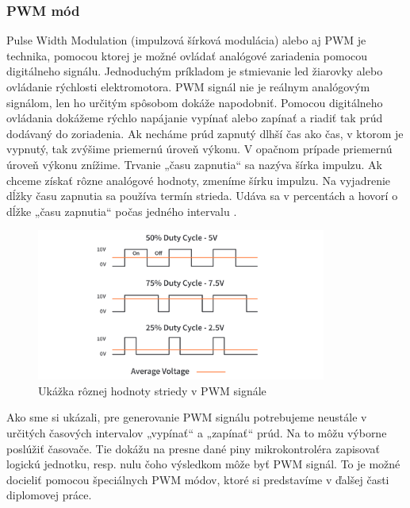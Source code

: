 \subsubsection{PWM mód}
\noindent \par
Pulse Width Modulation (impulzová šírková modulácia) alebo aj \acrshort{PWM} je technika, pomocou ktorej je možné ovládať analógové zariadenia pomocou digitálneho signálu.
Jednoduchým príkladom je stmievanie led žiarovky alebo ovládanie rýchlosti elektromotora. PWM signál nie je reálnym analógovým signálom, len ho určitým spôsobom dokáže napodobniť.
Pomocou digitálneho ovládania dokážeme rýchlo napájanie vypínať alebo zapínať a riadiť tak prúd dodávaný do zoriadenia. Ak necháme prúd zapnutý dlhší čas ako čas, v ktorom
je vypnutý, tak zvýšime priemernú úroveň výkonu. V opačnom prípade priemernú úroveň výkonu znížime. Trvanie „času zapnutia“ sa nazýva šírka impulzu.
Ak chceme získať rôzne analógové hodnoty, zmeníme šírku impulzu. Na vyjadrenie dĺžky času zapnutia sa používa termín strieda. Udáva sa v percentách
a hovorí o dĺžke „času zapnutia“  počas jedného intervalu \cite{WhatPWMSignal}.
\begin{figure}[!h]
    \centering
    \includegraphics[width=0.85\textwidth]{img/duty-cycle.jpg}
    \caption{Ukážka rôznej hodnoty striedy v PWM signále}
    \label{figure:pwm-signal}
\end{figure}

Ako sme si ukázali, pre generovanie PWM signálu potrebujeme neustále v určitých časových intervalov „vypínať“ a „zapínať“ prúd. Na to môžu výborne poslúžiť časovače.
Tie dokážu na presne dané piny mikrokontroléra zapisovať logickú jednotku, resp. nulu čoho výsledkom môže byť PWM signál. To je možné docieliť
pomocou špeciálnych PWM módov, ktoré si predstavíme v ďalšej časti diplomovej práce.

